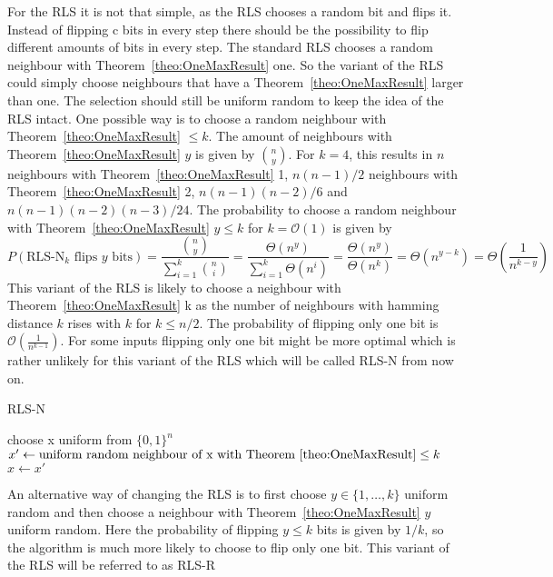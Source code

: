 For the RLS it is not that simple, as the RLS chooses a random bit and flips it.
Instead of flipping c bits in every step there should be the possibility to flip different amounts of bits in every step.
The standard RLS chooses a random neighbour with Theorem~\ref{theo:OneMaxResult} one.
So the variant of the RLS could simply choose neighbours that have a Theorem~\ref{theo:OneMaxResult} larger than one.
The selection should still be uniform random to keep the idea of the RLS intact.
One possible way is to choose a random neighbour with Theorem~\ref{theo:OneMaxResult} $\le k$.
The amount of neighbours with Theorem~\ref{theo:OneMaxResult} $y$ is given by $\binom{n}{y}$.
For $k=4$, this results in $n$ neighbours with Theorem~\ref{theo:OneMaxResult} 1, $n(n-1)/2$ neighbours with Theorem~\ref{theo:OneMaxResult} 2, $n(n-1)(n-2)/6$
and $n(n-1)(n-2)(n-3)/24$.
The probability to choose a random neighbour with Theorem~\ref{theo:OneMaxResult} $y \le k$ for $k = \mathcal{O}(1)$ is given by
\[P(\text{RLS-N}_k\text{ flips }y\text{ bits}) = \frac{\binom{n}{y}}{\sum_{i=1}^k \binom{n}{i}} = \frac{\Theta(n^y)}{\sum_{i=1}^k \Theta(n^i)}
      = \frac{\Theta(n^y)}{\Theta(n^k)} = \Theta(n^{y-k}) = \Theta(\frac{1}{n^{k-y}})\]
This variant of the RLS is likely to choose a neighbour with Theorem~\ref{theo:OneMaxResult} k as the number of neighbours with hamming
distance $k$ rises with $k$ for $k \le n/2$.
The probability of flipping only one bit is $\mathcal{O}(\frac{1}{n^{k-1}})$.
For some inputs flipping only one bit might be more optimal which is rather unlikely for this variant of the RLS which will be called RLS-N from now on.
\begin{algorithm}[bt]
      \caption{\textsc{RLS-N}}\label{alg:rlsN}

      \DontPrintSemicolon %

      \BlankLine
      choose x uniform from ${\{0,1\}}^n$\;
      {
      $x' \leftarrow \text{uniform random neighbour of x with Theorem~\ref{theo:OneMaxResult}} \le k$\;
      {
      {
            $x \leftarrow x'$\;
      }
      }
      }
\end{algorithm}

An alternative way of changing the RLS is to first choose $y \in \{1, \dots, k\}$ uniform random and then choose a neighbour with Theorem~\ref{theo:OneMaxResult} $y$ uniform random.
Here the probability of flipping $y \le k$ bits is given by $1/k$, so the algorithm is much more likely to choose to flip only one bit.
This variant of the RLS will be referred to as RLS-R

